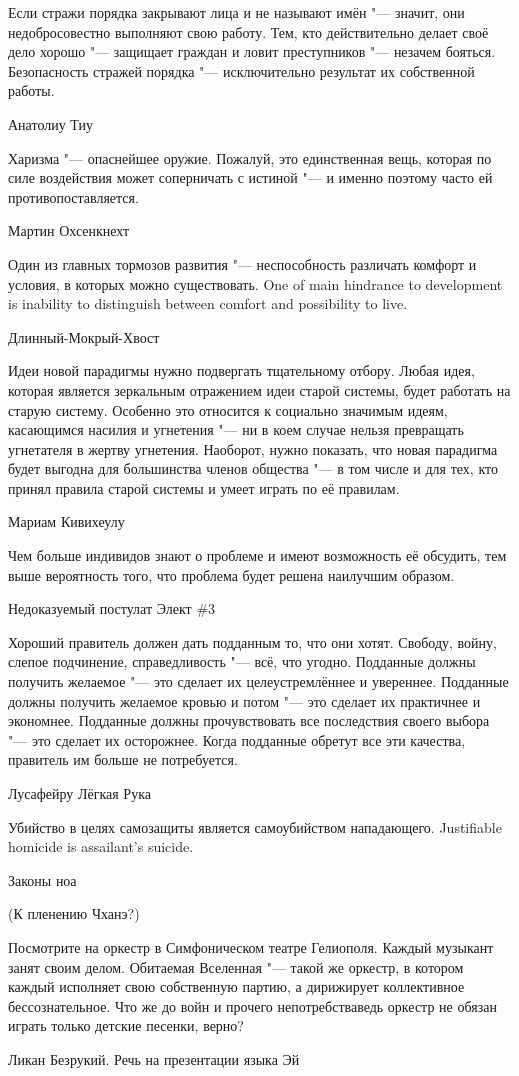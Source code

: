 \epigraph
{Если стражи порядка закрывают лица и не называют имён "--- значит, они недобросовестно выполняют свою работу.
Тем, кто действительно делает своё дело хорошо "--- защищает граждан и ловит преступников "--- незачем бояться.
Безопасность стражей порядка "--- исключительно результат их собственной работы.}
{Анатолиу Тиу}

\epigraph
{Харизма "--- опаснейшее оружие.
Пожалуй, это единственная вещь, которая по силе воздействия может соперничать с истиной "--- и именно поэтому часто ей противопоставляется.}
{Мартин Охсенкнехт}

\epigraph{
{Один из главных тормозов развития "--- неспособность различать комфорт и условия, в которых можно существовать.}
{One of main hindrance to development is inability to distinguish between comfort and possibility to live.}
}{Длинный-Мокрый-Хвост}

\epigraph
{Идеи новой парадигмы нужно подвергать тщательному отбору.
Любая идея, которая является зеркальным отражением идеи старой системы, будет работать на старую систему.
Особенно это относится к социально значимым идеям, касающимся насилия и угнетения "--- ни в коем случае нельзя превращать угнетателя в жертву угнетения.
Наоборот, нужно показать, что новая парадигма будет выгодна для большинства членов общества "--- в том числе и для тех, кто принял правила старой системы и умеет играть по её правилам.}
{Мариам Кивихеулу}

\epigraph
{Чем больше индивидов знают о проблеме и имеют возможность её обсудить, тем выше вероятность того, что проблема будет решена наилучшим образом.}
{Недоказуемый постулат Элект \#3}

\epigraph
{Хороший правитель должен дать подданным то, что они хотят.
Свободу, войну, слепое подчинение, справедливость "--- всё, что угодно.
Подданные должны получить желаемое "--- это сделает их целеустремлённее и увереннее.
Подданные должны получить желаемое кровью и потом "--- это сделает их практичнее и экономнее.
Подданные должны прочувствовать все последствия своего выбора "--- это сделает их осторожнее.
Когда подданные обретут все эти качества, правитель им больше не потребуется.}
{Лусафейру Лёгкая Рука}

\epigraph{
{Убийство в целях самозащиты является самоубийством нападающего.}
{Justifiable homicide is assailant's suicide.}
}{Законы ноа}

(К пленению Чханэ?)

\epigraph
{Посмотрите на оркестр в Симфоническом театре Гелиополя.
Каждый музыкант занят своим делом.
Обитаемая Вселенная "--- такой же оркестр, в котором каждый исполняет свою собственную партию, а дирижирует коллективное бессознательное.
Что же до войн и прочего непотребства\ldotst ведь оркестр не обязан играть только детские песенки, верно?}
{Ликан Безрукий.
Речь на презентации языка Эй}

